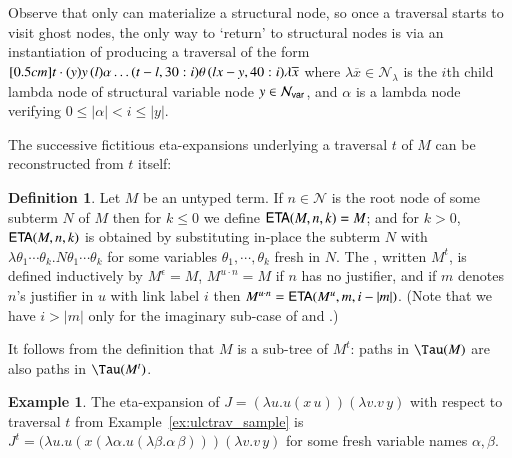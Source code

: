 \documentclass{elsarticle}
\theoremstyle{plain}
\theoremstyle{definition}
\newtheorem{definition}{Definition}[section]
\newtheorem{example}{Example}[section]
\newcommand\Nodes{\mathcal{N}}%
\newcommand\NodesVar{\Nodes_{\sf var}}%
\newcommand\NodesLmd{\Nodes_\lambda}%
\newcommand{\ghostvar}{\theta}
\newcommand{\ctree}{\Tau} %
\begin{document}
Observe that only  can materialize a structural node, so once a traversal starts to visit ghost nodes, the only way to `return'  to structural nodes is via an instantiation of  producing a traversal of the form
$
\Pstr[0.5cm]{ t \cdot (y){y} \, (l){\alpha}  \ldots (t-l,30:i){\ghostvar}
    \, (lx-y,40:i){\lambda \overline{x}}}
$
where
 $\lambda \overline{x} \in \NodesLmd$ is the $i$th child lambda node of structural variable node $y \in \NodesVar$,
and $\alpha$ is a lambda node verifying
 $0\leq |\alpha| < i \leq |y|$.


The successive fictitious eta-expansions underlying a traversal $t$ of $M$ can be reconstructed from $t$ itself:
\begin{definition}
\label{def:onthefly_etaexpansion}
Let $M$ be an untyped term. If $n\in \Nodes$ is the root node of some subterm $N$ of $M$ then
for $k \leq 0$ we define ${\sf ETA}(M, n, k) = M$; and for $k> 0$,
 ${\sf ETA}(M, n, k)$ is obtained by substituting in-place the subterm $N$ with $\lambda\theta_1 \cdots \theta_k. N \theta_1 \cdots \theta_k$ for some variables $\theta_1, \cdots, \theta_k$ fresh in $N$.
%
The , written $M^t$, is defined inductively by $M^\epsilon = M$,
$M^{u \cdot n} = M$ if $n$ has no justifier, and if $m$ denotes $n$'s justifier in $u$ with link label $i$ then $M^{u \cdot n} = {\sf ETA}(M^{u}, m, i-|m|)$.
%
(Note that we have $i>|m|$ only for the imaginary sub-case of  and .)
\end{definition}
It follows from the definition that $M$ is a sub-tree of $M^t$: paths in $\ctree(M)$ are also paths in $\ctree(M^t)$.

\begin{example}
The eta-expansion of $J = (\lambda u . u(x\,u)) (\lambda v . v\,y)$ with respect to traversal $t$ from Example~\ref{ex:ulctrav_sample} is
$J^t = (\lambda u . u(x (\lambda \alpha. u (\lambda \beta.\alpha\,\beta))) (\lambda v . v\,y)$
for some fresh variable names $\alpha, \beta$.
\end{example}
\end{document}
